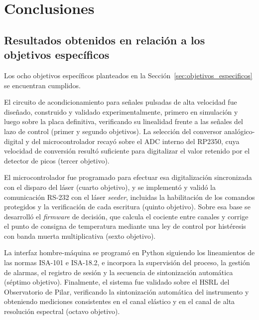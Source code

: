\chapter*{Conclusiones}
\label{cap:conclusiones}
{}

\section*{Resultados obtenidos en relación a los objetivos específicos}

Los ocho objetivos específicos planteados en la Sección~\ref{sec:objetivos_especificos} se encuentran cumplidos.

El circuito de acondicionamiento para señales pulsadas de alta velocidad fue diseñado,
construido y validado experimentalmente, primero en simulación y luego sobre la placa
definitiva, verificando su linealidad frente a las señales del lazo de control
(primer y segundo objetivos). La selección del conversor analógico-digital y del
microcontrolador recayó sobre el ADC interno del RP2350, cuya velocidad de conversión
resultó suficiente para digitalizar el valor retenido por el detector de picos
(tercer objetivo).

El microcontrolador fue programado para efectuar esa digitalización sincronizada con
el disparo del láser (cuarto objetivo), y se implementó y validó la comunicación
RS-232 con el láser \emph{seeder}, incluidas la habilitación de los comandos
protegidos y la verificación de cada escritura (quinto objetivo). Sobre esa base se
desarrolló el \emph{firmware} de decisión, que calcula el cociente entre canales y
corrige el punto de consigna de temperatura mediante una ley de control por
histéresis con banda muerta multiplicativa (sexto objetivo).

La interfaz hombre-máquina se programó en Python siguiendo los lineamientos de las
normas ISA-101 e ISA-18.2, e incorpora la supervisión del proceso, la gestión de
alarmas, el registro de sesión y la secuencia de sintonización automática (séptimo
objetivo). Finalmente, el sistema fue validado sobre el HSRL del Observatorio de
Pilar, verificando la sintonización automática del instrumento y obteniendo
mediciones consistentes en el canal elástico y en el canal de alta resolución
espectral (octavo objetivo).

